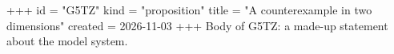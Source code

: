 +++
id = "G5TZ"
kind = "proposition"
title = "A counterexample in two dimensions"
created = 2026-11-03
+++
Body of G5TZ: a made-up statement about the model system.
